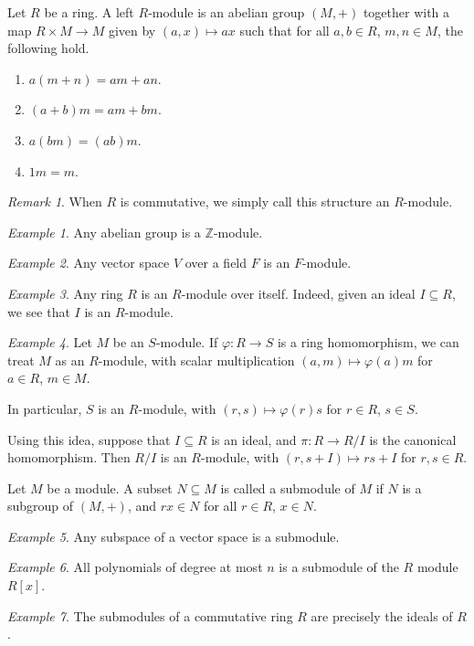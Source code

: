 \documentclass[11pt]{article}
\newcommand{\Z}{\mathbb{Z}}
\theoremstyle{definition}
\theoremstyle{remark}
\newtheorem*{remark}{Remark}
\newtheorem*{example}{Example}
\numberwithin{equation}{section}
\begin{document}
    \begin{definition}
        Let $R$ be a ring. A left $R$-module is an abelian group $(M, +)$ together
        with a map $R\times M \to M$ given by $(a, x) \mapsto ax$ such that for all
        $a, b \in R$, $m, n \in M$, the following hold. \begin{enumerate}
            \itemsep0em
            \item $a(m + n) = am + an$.
            \item $(a + b)m = am + bm$.
            \item $a(bm) = (ab)m$.
            \item $1m = m$.
        \end{enumerate}
        \begin{remark}
            When $R$ is commutative, we simply call this structure an $R$-module.
        \end{remark}
    \end{definition}
    \begin{example}
        Any abelian group is a $\Z$-module.
    \end{example}
    \begin{example}
        Any vector space $V$ over a field $F$ is an $F$-module.
    \end{example}
    \begin{example}
        Any ring $R$ is an $R$-module over itself.
        Indeed, given an ideal $I \subseteq R$, we see that $I$ is an $R$-module.
    \end{example}
    
    \begin{example}
        Let $M$ be an $S$-module. If $\varphi\colon R \to S$ is a ring homomorphism,
        we can treat $M$ as an $R$-module, with scalar multiplication $(a, m) \mapsto
        \varphi(a)m$ for $a \in R$, $m \in M$.

        In particular, $S$ is an $R$-module, with $(r, s) \mapsto \varphi(r)s$ for $r
        \in R$, $s \in S$.

        Using this idea, suppose that $I\subseteq R$ is an ideal, and $\pi\colon
        R \to R/I$ is the canonical homomorphism. Then $R/I$ is an $R$-module, with
        $(r, s + I) \mapsto rs + I$ for $r, s \in R$.
    \end{example}


    \begin{definition}
        Let $M$ be a module. A subset $N\subseteq M$ is called a submodule of $M$ if
        $N$ is a subgroup of $(M, +)$, and $rx \in N$ for all $r \in R$, $x \in N$.
    \end{definition}
    \begin{example}
        Any subspace of a vector space is a submodule.
    \end{example}
    \begin{example}
        All polynomials of degree at most $n$ is a submodule of the $R$ module
        $R[x]$.
    \end{example}
    \begin{example}
        The submodules of a commutative ring $R$ are precisely the ideals of $R$.
    \end{example}
\end{document}
